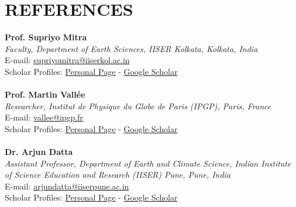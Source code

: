 \documentclass[a4paper,9pt]{extarticle}
\begin{document}
\section*{REFERENCES}
\textbf{Prof. Supriyo Mitra}\\
\textit{Faculty, Department of Earth Sciences, IISER Kolkata, Kolkata, India}\\
E-mail: \href{mailto:supriyomitra@iiserkol.ac.in}{supriyomitra@iiserkol.ac.in}\\
Scholar Profiles: \href{https://www.iiserkol.ac.in/~supriyomitra/}{Personal Page} - \href{https://scholar.google.com/citations?user=_zF1Zr8AAAAJ&hl=en}{Google Scholar} \\ \\
\textbf{Prof. Martin Vall\'ee}\\
\textit{Researcher, Institut de Physique du Globe de Paris (IPGP), Paris, France}\\
E-mail: \href{mailto:vallee@ipgp.fr}{vallee@ipgp.fr}\\
Scholar Profiles: \href{https://www.ipgp.fr/~vallee/}{Personal Page} - \href{https://scholar.google.com/citations?user=d39g-UgAAAAJ&hl=fr}{Google Scholar}  \\ \\
\textbf{Dr. Arjun Datta}\\
\textit{Assistant Professor, Department of Earth and Climate Science, Indian Institute of Science Education and Research (IISER) Pune, Pune, India}\\
E-mail: \href{mailto:arjundatta@iiserpune.ac.in }{arjundatta@iiserpune.ac.in }\\
Scholar Profiles: \href{https://sites.google.com/view/arjun-datta}{Personal Page} - \href{https://scholar.google.com/citations?hl=en&user=tgjqIncAAAAJ&view_op=list_works&sortby=pubdate}{Google Scholar} \\ \\
\end{document}
